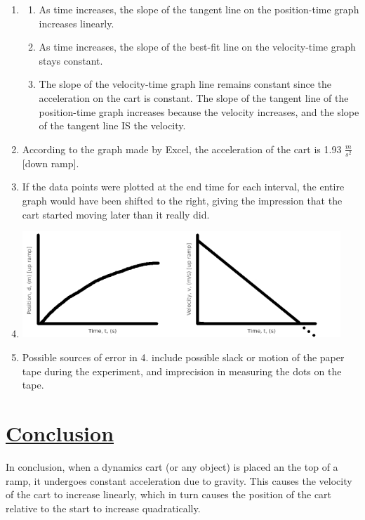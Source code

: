 \documentclass[letterpaper,12pt]{article}
\begin{document}
\begin{enumerate}
    \item \begin{enumerate}
        \item As time increases, the slope of the tangent line on the position-time graph increases linearly.
        \item As time increases, the slope of the best-fit line on the velocity-time graph stays constant.
        \item The slope of the velocity-time graph line remains constant since the acceleration on the cart is constant. The slope of the tangent line of the position-time graph increases because the velocity increases, and the slope of the tangent line IS the velocity.
    \end{enumerate}
    \item According to the graph made by Excel, the acceleration of the cart is 1.93 $\frac{m}{s^2}$ [down ramp].
    \item If the data points were plotted at the end time for each interval, the entire graph would have been shifted to the right, giving the impression that the cart started moving later than it really did.
    \item\includegraphics[width=6cm]{p-t}\includegraphics[width=6cm]{v-t}
    \item Possible sources of error in 4. include possible slack or motion of the paper tape during the experiment, and imprecision in measuring the dots on the tape.
\end{enumerate}

\section*{\underline{Conclusion}}
In conclusion, when a dynamics cart (or any object) is placed an the top of a ramp, it undergoes constant acceleration due to gravity. This causes the velocity of the cart to increase linearly, which in turn causes the position of the cart relative to the start to increase quadratically.
\end{document}

